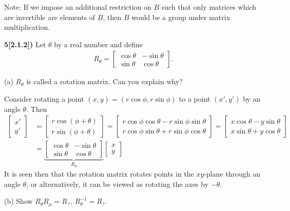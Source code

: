 \documentclass[12pt,a4paper]{article}
\newcommand{\prob}[2]{\textbf{#1)} #2}
\begin{document}
Note: If we impose an additional restriction on $B$ such that only matrices which are invertible are elements of $B$, then $B$ would be a group under matrix multiplication.

\prob{5[2.1.2]}{Let $\theta$ by a real number and define 
\begin{align*}
R_{\theta} = \begin{bmatrix}
\cos{\theta} & -\sin{\theta} \\
\sin{\theta} & \cos{\theta}
\end{bmatrix}.
\end{align*}
}
(a) $R_{\theta}$ is called a rotation matrix. Can you explain why?

Consider rotating a point $(x,y) = (r\cos{\phi},r\sin{\phi})$ to a point $(x',y')$ by an angle $\theta$. Then
\begin{align*}
\begin{bmatrix}
x' \\ y'
\end{bmatrix}
&=
\begin{bmatrix}
r\cos{(\phi + \theta)} \\ r\sin{(\phi + \theta)}
\end{bmatrix}
= \begin{bmatrix}
r\cos{\phi}\cos{\theta} - r\sin{\phi}\sin{\theta} \\
r\cos{\phi}\sin{\theta} + r\sin{\phi}\cos{\theta}
\end{bmatrix}
=
\begin{bmatrix}
x\cos{\theta} - y\sin{\theta} \\
x\sin{\theta} + y\cos{\theta}
\end{bmatrix}
\\
&=
\underbrace{\begin{bmatrix}
\cos{\theta} & -\sin{\theta} \\
\sin{\theta} & \cos{\theta}
\end{bmatrix}}_{R_{\theta}}
\begin{bmatrix}
x \\ y
\end{bmatrix}
\end{align*}
It is seen then that the rotation matrix rotates points in the $xy$-plane through an angle $\theta$, or alternatively, it can be viewed as rotating the axes by $-\theta$.

(b) Show $R_{\theta}R_{\mu} = R_{?},~R_{\theta}^{-1} = R_{?}$.
\end{document}
